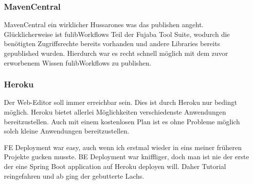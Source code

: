 \subsubsection{MavenCentral}\label{subsubsec:mavencentral}
\todo
MavenCentral ein wirklicher Hussarones was das publishen angeht.
Glücklicherweise ist fulibWorkflows Teil der Fujaba Tool Suite, wodurch die benötigten
Zugriffsrechte bereits vorhanden und andere Libraries bereits gepublished wurden.
Hierdurch war es recht schnell möglich mit dem zuvor erworbenem Wissen fulibWorkflows
zu publishen.

\subsubsection{Heroku}\label{subsubsec:heroku}
\todo
Der Web-Editor soll immer erreichbar sein.
Dies ist durch Heroku nur bedingt möglich.
Heroku bietet allerlei Möglichkeiten verschiedenste Anwendungen bereitzustellen.
Auch mit einem kostenlosen Plan ist es ohne Probleme möglich solch kleine Anwendungen bereitzustellen.

FE Deployment war easy, auch wenn ich erstmal wieder in eins meiner früheren Projekte gucken musste.
BE Deployment war kniffliger, doch man ist nie der erste der eine Spring Boot application
auf Heroku deployen will.
Daher Tutorial reingefahren und ab ging der gebutterte Lachs.
